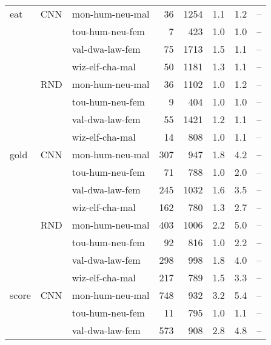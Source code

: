 \documentclass{article}
\begin{document}
\begin{table}[t!]
{\begin{tabular}{lllrrrrr}
\midrule
       eat &   CNN &  mon-hum-neu-mal &     36 &  1254 &               1.1 &            1.2 &   -- \\
        &    &  tou-hum-neu-fem &      7 &   423 &               1.0 &            1.0 &   -- \\
        &    &  val-dwa-law-fem &     75 &  1713 &               1.5 &            1.1 &   -- \\
        &    &  wiz-elf-cha-mal &     50 &  1181 &               1.3 &            1.1 &   -- \\
\cmidrule{2-8}
        &   RND &  mon-hum-neu-mal &     36 &  1102 &               1.0 &            1.2 &   -- \\
        &    &  tou-hum-neu-fem &      9 &   404 &               1.0 &            1.0 &   -- \\
        &    &  val-dwa-law-fem &     55 &  1421 &               1.2 &            1.1 &   -- \\
        &    &  wiz-elf-cha-mal &     14 &   808 &               1.0 &            1.1 &   -- \\
\midrule
      gold &   CNN &  mon-hum-neu-mal &    307 &   947 &               1.8 &            4.2 &   -- \\
       &    &  tou-hum-neu-fem &     71 &   788 &               1.0 &            2.0 &   -- \\
       &    &  val-dwa-law-fem &    245 &  1032 &               1.6 &            3.5 &   -- \\
       &    &  wiz-elf-cha-mal &    162 &   780 &               1.3 &            2.7 &   -- \\
\cmidrule{2-8}
       &   RND &  mon-hum-neu-mal &    403 &  1006 &               2.2 &            5.0 &   -- \\
       &    &  tou-hum-neu-fem &     92 &   816 &               1.0 &            2.2 &   -- \\
       &    &  val-dwa-law-fem &    298 &   998 &               1.8 &            4.0 &   -- \\
       &    &  wiz-elf-cha-mal &    217 &   789 &               1.5 &            3.3 &   -- \\
\midrule
     score &   CNN &  mon-hum-neu-mal &    748 &   932 &               3.2 &            5.4 &   -- \\
      &    &  tou-hum-neu-fem &     11 &   795 &               1.0 &            1.1 &   -- \\
      &    &  val-dwa-law-fem &    573 &   908 &               2.8 &            4.8 &   -- \\

\end{tabular}}
\end{table}
\end{document}
